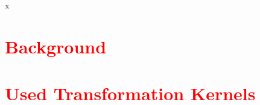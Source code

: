x


\section{\textcolor{red}{Background}}

\section{\textcolor{red}{Used Transformation Kernels}}

\printbibliography[heading=subbibliography]

